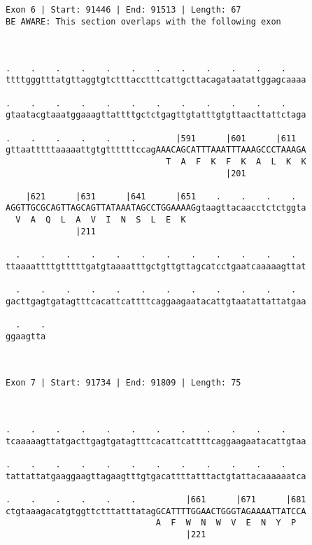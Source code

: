 \documentclass{article}
\begin{document}
\begin{Verbatim}
                                               
 
Exon 6 | Start: 91446 | End: 91513 | Length: 67
BE AWARE: This section overlaps with the following exon



.    .    .    .    .    .    .    .    .    .    .    .    
ttttgggtttatgttaggtgtctttacctttcattgcttacagataatattggagcaaaa
                                                            
.    .    .    .    .    .    .    .    .    .    .    .    
gtaatacgtaaatggaaagttattttgctctgagttgtatttgtgttaacttattctaga
                                                            
.    .    .    .    .    .        |591      |601      |611  
gttaatttttaaaaattgtgttttttccagAAACAGCATTTAAATTTAAAGCCCTAAAGA
                                T  A  F  K  F  K  A  L  K  K
                                            |201            
  
    |621      |631      |641      |651    .    .    .    .  
AGGTTGCGCAGTTAGCAGTTATAAATAGCCTGGAAAAGgtaagttacaacctctctggta
  V  A  Q  L  A  V  I  N  S  L  E  K                        
              |211                                          
  
  .    .    .    .    .    .    .    .    .    .    .    .  
ttaaaattttgtttttgatgtaaaatttgctgttgttagcatcctgaatcaaaaagttat
                                                            
  .    .    .    .    .    .    .    .    .    .    .    .  
gacttgagtgatagtttcacattcattttcaggaagaatacattgtaatattattatgaa
                                                            
  .    .
ggaagtta
        
        
 
Exon 7 | Start: 91734 | End: 91809 | Length: 75



.    .    .    .    .    .    .    .    .    .    .    .    
tcaaaaagttatgacttgagtgatagtttcacattcattttcaggaagaatacattgtaa
                                                            
.    .    .    .    .    .    .    .    .    .    .    .    
tattattatgaaggaagttagaagtttgtgacattttatttactgtattacaaaaaatca
                                                            
.    .    .    .    .    .          |661      |671      |681
ctgtaaagacatgtggttctttatttatagGCATTTTGGAACTGGGTAGAAAATTATCCA
                              A  F  W  N  W  V  E  N  Y  P  
                                    |221                    
  

\end{Verbatim}
\end{document}
